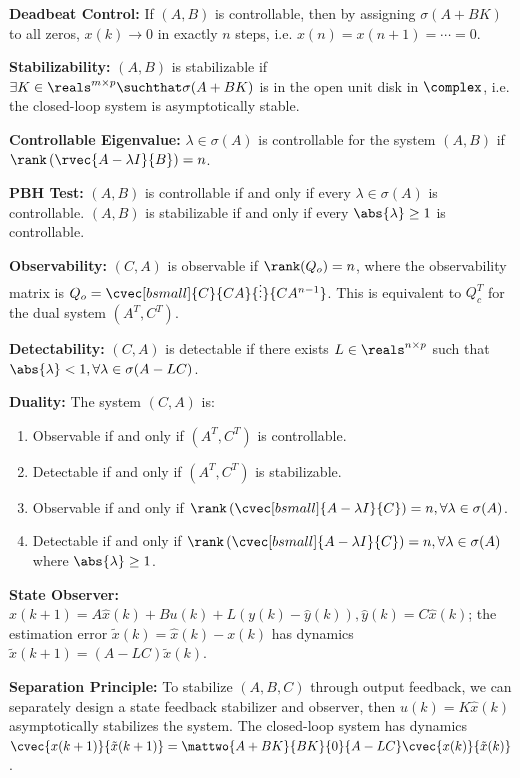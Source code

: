 \documentclass[twocolumn, 8pt]{extarticle}
\begin{document}
\textbf{Deadbeat Control:} If \((A, B)\) is controllable, then by assigning \(\sigma(A + BK)\) to all zeros, \(x(k) \to 0\)
in exactly \(n\) steps, i.e. \(x(n) = x(n + 1) = \cdots = 0\).

\textbf{Stabilizability:} \((A, B)\) is stabilizable if $\exists K \in \reals^{m \times p} \suchthat \sigma(A + BK)$ is in the open unit disk in $\complex$, i.e. the closed-loop system is asymptotically stable.

\textbf{Controllable Eigenvalue:} $\lambda \in \sigma(A)$ is controllable for the system $(A, B)$ if
$\rank\left(\rvec{A - \lambda I}{B}\right) = n$.

\textbf{PBH Test:} $(A, B)$ is controllable if and only if every $\lambda \in \sigma(A)$ is controllable.
$(A, B)$ is stabilizable if and only if every $\abs{\lambda} \geq 1$ is controllable.

\textbf{Observability:} \((C, A)\) is observable if $\rank(Q_o) = n$, where the observability matrix is
\(Q_o = \cvec[bsmall]{C}{CA}{\vdots}{CA^{n - 1}}\).
This is equivalent to \(Q_c^T\) for the dual system \((A^T, C^T)\).

\textbf{Detectability:} $(C, A)$ is detectable if there exists $L \in \reals^{n \times p}$ such that $\abs{\lambda} < 1,
\forall\lambda \in \sigma(A - LC)$.

\textbf{Duality:} The system \((C, A)\) is:
\begin{enumerate}
	\item Observable if and only if $(A^T, C^T)$ is controllable.
	\item Detectable if and only if $(A^T, C^T)$ is stabilizable.
	\item Observable if and only if $\rank\left(\cvec[bsmall]{A - \lambda I}{C}\right) = n, \forall\lambda \in \sigma(A)$.
	\item Detectable if and only if $\rank\left(\cvec[bsmall]{A - \lambda I}{C}\right) = n, \forall\lambda \in \sigma(A)$ where $\abs{\lambda} \geq 1$.
\end{enumerate}

\textbf{State Observer:} \(\hat x(k + 1) = A\hat x(k) + Bu(k) + L(y(k) - \hat y(k)), \hat y(k) = C\hat x(k)\);
the estimation error $\tilde x(k) = \hat x(k) - x(k)$ has dynamics \(\tilde x(k + 1) = (A - LC)\tilde x(k)\).

\textbf{Separation Principle:} To stabilize \((A, B, C)\) through output feedback, we can separately
design a state feedback stabilizer and observer, then \(u(k) = K\hat x(k)\) asymptotically stabilizes the system.
The closed-loop system has dynamics \(\cvec{x(k + 1)}{\tilde x(k + 1)} = \mattwo{A + BK}{BK}{0}{A - LC}\cvec{x(k)}{\tilde x(k)}\).
\end{document}
